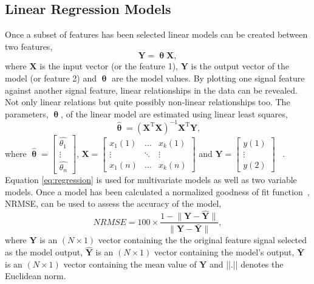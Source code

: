 \documentclass[]{article}
\begin{document}
\subsection{Linear Regression Models}
Once a subset of features has been selected linear models can be created between two features,
\begin{equation} \label{eq:linearModel}
	\mathbf{Y} = \boldsymbol{\uptheta} \mathbf{X},
\end{equation}
where $\mathbf{X}$ is the input vector (or the feature 1), $\mathbf{Y}$ is the output vector of the model (or feature 2) and $\boldsymbol{\uptheta}$ are the model values. By plotting one signal feature against another signal feature, linear relationships in the data can be revealed. Not only linear relations but quite possibly non-linear relationships too. The parameters, $\boldsymbol{\uptheta}$, of the linear model are estimated using linear least squares, 
\begin{equation} \label{eq:regression}
	\hat{\boldsymbol{\uptheta}} = (\mathbf{X}^{\textrm{T}} \mathbf{X})^{-1} \mathbf{X}^{\textrm{T}} \mathbf{Y},
\end{equation}
where $ \hat{\boldsymbol{\uptheta}} = \begin{bmatrix} \hat{\theta_{1}} \\ \vdots \\ \hat{\theta_{n}} \end{bmatrix} $, $ \mathbf{X} = \begin{bmatrix} x_{1}(1) & \hdots & x_{k}(1) \\ \vdots & \ddots & \vdots \\ x_{1}(n) & \hdots & x_{k}(n)  \end{bmatrix}$ and 
$ \mathbf{Y} = \begin{bmatrix} y(1) \\ \vdots \\ y(2)\end{bmatrix}$ ~\cite{james2013introduction}.\\
Equation \ref{eq:regression} is used for multivariate models as well as two variable models. Once a model has been calculated a normalized goodness of fit function~\cite{gonzalez2023time}, \gls{NRMSE}, can be used to assess the accuracy of the model,
\begin{equation}
	NRMSE = 100 \times \frac{ 1 - \lVert\mathbf{Y} - \mathbf{\hat{Y}}\rVert } { \lVert \mathbf{Y} - \mathbf{\bar{Y}} \rVert },
\end{equation}
where $\mathbf{Y}$ is an $(N \times 1)$ vector containing the the original feature signal selected as the model output, $\mathbf{\hat{Y}}$ is an $(N \times 1)$ vector containing the model’s output, $\mathbf{\bar{Y}}$ is an $(N \times 1)$ vector containing the mean value of $\mathbf{Y}$ and ||.|| denotes the Euclidean norm.
\end{document}
